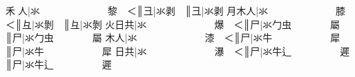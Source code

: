 {\cjk{}{\cnsym{}　　　}禾{\cnjzr{}}人}|{\cjk{}氺{\cnsym{}　　　　　　　}黎{\cnsym{}　}＜}║{\cjk{}{\cnsym{}　　　　　　}彐}|{\cjk{}氺剥{\cnsym{}　}}║{\cjk{}{\cnsym{}　　　　　　　}彐}|{\cjk{}氺剥} 
{\cjk{}{\cnsym{}　　　}月木人}|{\cjk{}氺{\cnsym{}　　　　　　　}膝{\cnsym{}　}＜}║{\cjk{}{\cnsym{}　　　　　　}彑}|{\cjk{}氺剝{\cnsym{}　}}║{\cjk{}{\cnsym{}　　　　　　　}彑}|{\cjk{}氺剝} 
{\cjk{}{\cnsym{}　　　}火日共}|{\cjk{}氺{\cnsym{}　　　　　　　}爆{\cnsym{}　}＜}║{\cjk{}{\cnsym{}　　　　　　}尸}|{\cjk{}氺勹虫{\cnsym{}　　　　}屬{\cnsym{}　}}║{\cjk{}{\cnsym{}　　　　　　　}尸}|{\cjk{}氺勹虫{\cnsym{}　　　　}屬} 
{\cjk{}{\cnsym{}　　　}木人}|{\cjk{}氺{\cnsym{}　　　　　　　}漆{\cnsym{}　}＜}║{\cjk{}{\cnsym{}　　　　　　}尸}|{\cjk{}氺牛{\cnsym{}　　　　　　}犀{\cnsym{}　}}║{\cjk{}{\cnsym{}　　　　　　　}尸}|{\cjk{}氺牛{\cnsym{}　　　　　　}犀} 
{\cjk{}{\cnsym{}　　　}日共}|{\cjk{}氺{\cnsym{}　　　　　　　}瀑{\cnsym{}　}＜}║{\cjk{}{\cnsym{}　　　　　　}尸}|{\cjk{}氺牛辶{\cnsym{}　　　　　}遲{\cnsym{}　}}║{\cjk{}{\cnsym{}　　　　　　　}尸}|{\cjk{}氺牛辶{\cnsym{}　　　　　}遲} 
\endgroup{}{}

\endgroup{}\begin{multicols}{2}\end{multicols}
